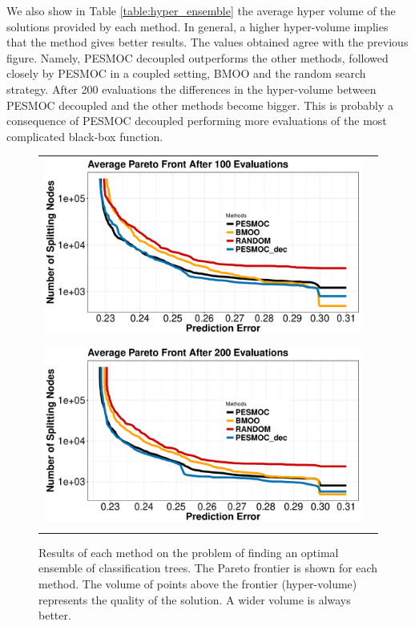 \documentclass[review,preprint,12pt]{elsarticle}
\begin{document}
We also show in Table \ref{table:hyper_ensemble} the average hyper volume of the solutions provided by each 
method. In general, a higher hyper-volume implies that the method gives better results. The values obtained agree with 
the previous figure. Namely, PESMOC decoupled outperforms the other methods, followed closely by PESMOC in a 
coupled setting, BMOO and the random search strategy. After 200 evaluations the differences in the hyper-volume 
between PESMOC decoupled and the other methods become bigger. This is probably a consequence of 
PESMOC decoupled performing more evaluations of the most complicated black-box function.


\begin{figure}[H]
\begin{center}
        \begin{tabular}{cc}
                \vspace{-.2cm}
                \includegraphics[width=0.75\linewidth]{figures/real/100_ensemble.pdf} \\ \\
                \includegraphics[width=0.75\linewidth]{figures/real/200_ensemble.pdf} \\
                \vspace{-.1cm}
        \end{tabular}
        \caption{Results of each method on the problem of finding an optimal ensemble of classification trees.
		The Pareto frontier is shown for each method. The volume of points above the frontier 
		(hyper-volume) represents the quality of the solution. A wider volume is always better.}
        \label{fig:ensemble_results}
\end{center}
\end{figure}
\end{document}
